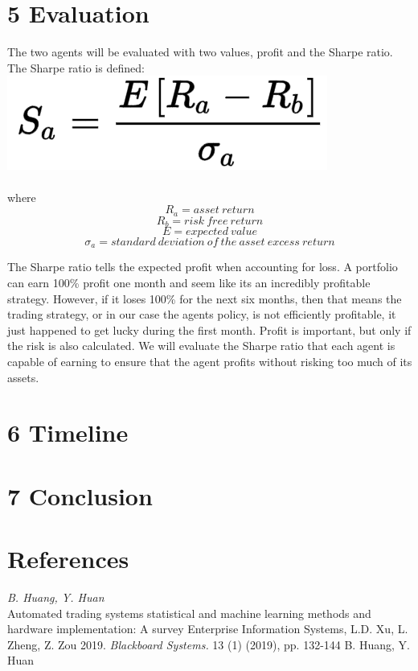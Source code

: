 \documentclass[letterpaper]{article}
\begin{document}
\section{5 Evaluation}
The two agents will be evaluated with two values, profit and the Sharpe ratio. The Sharpe ratio is defined:
\includegraphics{Sharpe} 
\\
\\
where
\[ R_a = asset\ return \] 
\[ R_b = risk\ free\ return \] 
\[ E = expected\  value \] 
\[ \sigma_a = standard\ deviation\ of\ the\ asset\ excess\ return \] 

The Sharpe ratio tells the expected profit when accounting for loss. A portfolio can earn 100\% profit one month and seem like its an incredibly profitable strategy. However, if it loses 100\% for the next six months, then that means the trading strategy, or in our case the agents policy, is not efficiently profitable, it just happened to get lucky during the first month. Profit is important, but only if the risk is also calculated. We will evaluate the Sharpe ratio that each agent is capable of earning to ensure that the agent profits without risking too much of its assets.
	
\section{6 Timeline}

\section{7 Conclusion}

\section{References}
\smallskip \noindent \textit{B. Huang, Y. Huan}\\
Automated trading systems statistical and machine learning methods and hardware implementation: A survey Enterprise Information Systems, L.D. Xu, L. Zheng, Z. Zou 2019. \textit{Blackboard Systems.} 13 (1) (2019), pp. 132-144
B. Huang, Y. Huan
\end{document}

